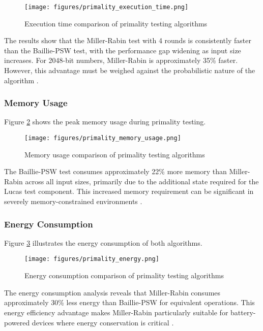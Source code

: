 \begin{figure}[h]
\centering
\texttt{[image: figures/primality\_execution\_time.png]}
\caption{Execution time comparison of primality testing algorithms}
\label{fig:primality_execution_time}
\end{figure}

The results show that the Miller-Rabin test with 4 rounds is consistently faster than the Baillie-PSW test, with the performance gap widening as input size increases. For 2048-bit numbers, Miller-Rabin is approximately 35\% faster. However, this advantage must be weighed against the probabilistic nature of the algorithm \cite{resource_constrained}.

\subsubsection{Memory Usage}
Figure \ref{fig:primality_memory_usage} shows the peak memory usage during primality testing.

\begin{figure}[h]
\centering
\texttt{[image: figures/primality\_memory\_usage.png]}
\caption{Memory usage comparison of primality testing algorithms}
\label{fig:primality_memory_usage}
\end{figure}

The Baillie-PSW test consumes approximately 22\% more memory than Miller-Rabin across all input sizes, primarily due to the additional state required for the Lucas test component. This increased memory requirement can be significant in severely memory-constrained environments \cite{iot_survey}.

\subsubsection{Energy Consumption}
Figure \ref{fig:primality_energy} illustrates the energy consumption of both algorithms.

\begin{figure}[h]
\centering
\texttt{[image: figures/primality\_energy.png]}
\caption{Energy consumption comparison of primality testing algorithms}
\label{fig:primality_energy}
\end{figure}

The energy consumption analysis reveals that Miller-Rabin consumes approximately 30\% less energy than Baillie-PSW for equivalent operations. This energy efficiency advantage makes Miller-Rabin particularly suitable for battery-powered devices where energy conservation is critical \cite{energy_efficient}.

